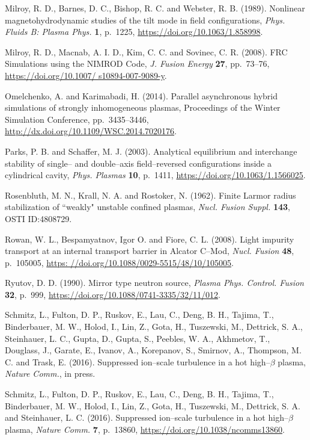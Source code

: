 \documentclass[a4paper,openany,12pt]{book}
\begin{document}
\begin{thebibliography}{100}
\bibitem{}
Milroy, R. D., Barnes, D. C., Bishop, R. C. and Webster, R. B. (1989). Nonlinear magnetohydrodynamic studies of the tilt mode in field configurations, \emph{Phys. Fluids B: Plasma Phys.} \textbf{1}, p.~1225, 
\url{https://doi.org/10.1063/1.858998}.

\bibitem{}
Milroy, R. D., Macnab, A. I. D., Kim, C. C. and Sovinec, C. R. (2008). FRC Simulations using the NIMROD Code, 
\emph{J. Fusion Energy} \textbf{27}, pp.~73--76, \url{https://doi.org/10.1007/ s10894-007-9089-y}.

\bibitem{}
Omelchenko, A. and Karimabadi, H. (2014). Parallel asynchronous hybrid simulations of strongly inhomogeneous plasmas, Proceedings of the Winter Simulation Conference, pp.~3435--3446, 
\url{http://dx.doi.org/10.1109/WSC.2014.7020176}.

\bibitem{}
Parks, P. B. and Schaffer, M. J. (2003). Analytical equilibrium and interchange stability of single-- and double--axis field--reversed configurations inside a cylindrical cavity, \emph{Phys. Plasmas} \textbf{10}, p.~1411, \url{https://doi.org/10.1063/1.1566025}.

\bibitem{}
Rosenbluth, M. N., Krall, N. A. and Rostoker, N. (1962). Finite Larmor radius stabilization of ``weakly" unstable confined plasmas, \emph{Nucl. Fusion Suppl.} \textbf{143}, OSTI ID:4808729.

\bibitem{}
Rowan, W. L., Bespamyatnov, Igor O. and Fiore, C. L. (2008). Light impurity transport at an internal transport barrier in Alcator C--Mod, \emph{Nucl. Fusion} \textbf{48}, p.~105005, 
\url{https: //doi.org/10.1088/0029-5515/48/10/105005}.

\bibitem{}
Ryutov, D. D. (1990). Mirror type neutron source, \emph{Plasma Phys. Control. Fusion} \textbf{32}, p.~999, 
\url{https://doi.org/10.1088/0741-3335/32/11/012}.

\bibitem{}
Schmitz, L., Fulton, D. P., Ruskov, E., Lau, C., Deng, B. H., Tajima, T., Binderbauer, M. W., Holod, I., Lin, Z., Gota, H., Tuszewski, M., Dettrick, S. A., Steinhauer, L. C., Gupta, D., Gupta, S., Peebles, W. A., Akhmetov, T., Douglass, J., Garate, E., Ivanov, A., Korepanov, S., Smirnov, A., Thompson, M. C. and Trask, E. (2016). Suppressed ion--scale turbulence in a hot high--$\beta$ plasma, \emph{Nature Comm.}, in press.

\bibitem{}
Schmitz, L., Fulton, D. P., Ruskov, E., Lau, C., Deng, B. H., Tajima, T., Binderbauer, M. W., Holod, I., Lin, Z., Gota, H., Tuszewski, M., Dettrick, S. A. and Steinhauer, L. C. (2016). Suppressed ion--scale turbulence in a hot high--$\beta$ plasma, \emph{Nature Comm.} \textbf{7}, p.~13860, \url{https://doi.org/10.1038/ncomms13860}.


\end{thebibliography}
\end{document}
